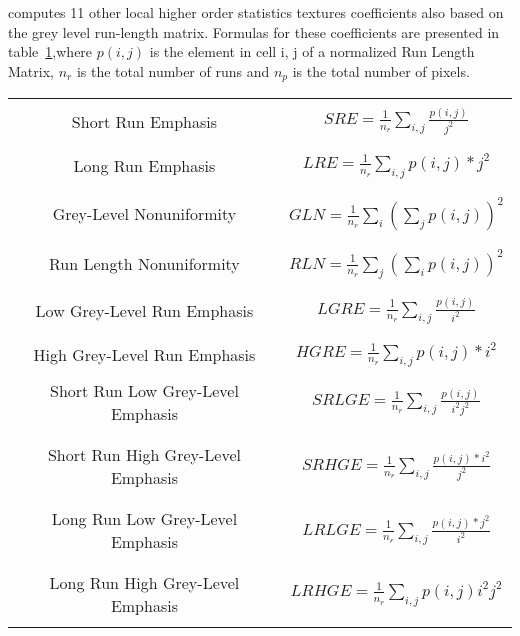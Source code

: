  computes 11
other local higher order statistics textures coefficients also based on the grey
level run-length matrix. Formulas for these coefficients are presented in
table~\ref{tab:haralickHigherOrderFeatures},where $p(i, j)$ is the element in
cell i, j of a normalized Run Length Matrix, $n_r$ is the total number of runs
and $n_p$ is the total number of pixels.

\begin{table}
\begin{center}
\begin{tabular}{|c|c|}
\hline
& \\
Short Run Emphasis & $ SRE = \frac{1}{n_r} \sum_{i, j}\frac{p(i, j)}{j^2} $ \\
& \\
\hline
& \\
Long Run Emphasis & $ LRE =  \frac{1}{n_r} \sum_{i, j}p(i, j) * j^2 $ \\
& \\
\hline
& \\
Grey-Level Nonuniformity & $ GLN = \frac{1}{n_r} \sum_{i} \left( \sum_{j}{p(i, j)} \right)^2 $ \\
& \\
\hline
& \\
Run Length Nonuniformity &  $ RLN = \frac{1}{n_r} \sum_{j} \left( \sum_{i}{p(i, j)} \right)^2 $ \\
& \\
\hline
& \\
Low Grey-Level Run Emphasis & $ LGRE = \frac{1}{n_r} \sum_{i, j}\frac{p(i, j)}{i^2} $ \\
& \\
\hline
& \\
High Grey-Level Run Emphasis & $ HGRE = \frac{1}{n_r} \sum_{i, j}p(i, j) * i^2 $ \\
& \\
\hline
Short Run Low Grey-Level Emphasis & $ SRLGE = \frac{1}{n_r} \sum_{i, j}\frac{p(i, j)}{i^2 j^2} $ \\
& \\
\hline
& \\
Short Run High Grey-Level Emphasis & $ SRHGE = \frac{1}{n_r} \sum_{i, j}\frac{p(i, j) * i^2}{j^2} $ \\
& \\
\hline
& \\
Long Run Low Grey-Level Emphasis & $ LRLGE = \frac{1}{n_r} \sum_{i, j}\frac{p(i, j) * j^2}{i^2} $ \\
& \\
\hline
& \\
Long Run High Grey-Level Emphasis & $ LRHGE = \frac{1}{n_r} \sum_{i, j} p(i, j) i^2 j^2 $ \\
& \\
\hline
\end{tabular}
\end{center}
\label{tab:haralickHigherOrderFeatures}
\end{table}

